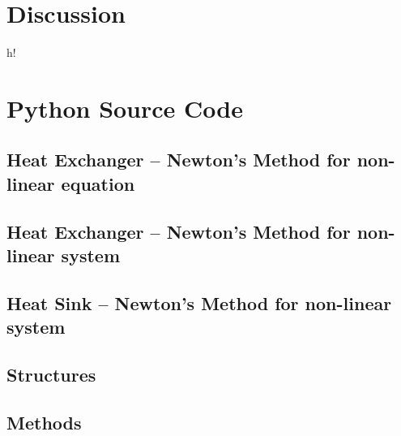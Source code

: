 \documentclass[11pt, a4paper]{article}
\theoremstyle{definition}
\begin{document}
\section{Discussion}
\newpage
\begin{thebibliography}{h!}

\end{thebibliography}
\newpage
\appendix
\section{Python Source Code}
\label{app:code}

\subsection*{Heat Exchanger -- Newton's Method for non-linear equation}


\subsection*{Heat Exchanger -- Newton's Method for non-linear system}


\subsection*{Heat Sink -- Newton's Method for non-linear system}


\subsection*{Structures}


\subsection*{Methods}

\end{document}
